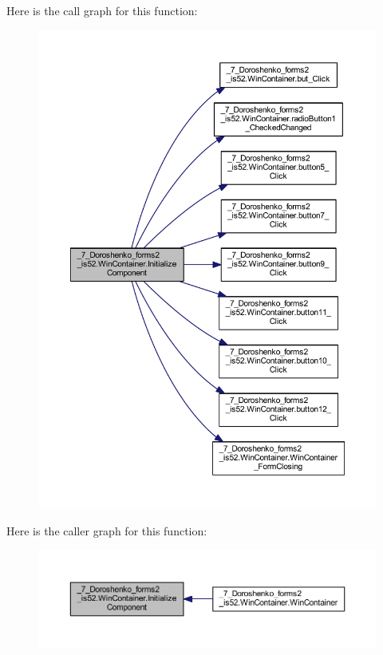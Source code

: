 Here is the call graph for this function\+:
\nopagebreak
\begin{figure}[H]
\begin{center}
\leavevmode
\includegraphics[width=350pt]{class__7___doroshenko__forms2__is52_1_1_win_container_a2273d289ead85c38898634df2eca5613_cgraph}
\end{center}
\end{figure}
Here is the caller graph for this function\+:
\nopagebreak
\begin{figure}[H]
\begin{center}
\leavevmode
\includegraphics[width=350pt]{class__7___doroshenko__forms2__is52_1_1_win_container_a2273d289ead85c38898634df2eca5613_icgraph}
\end{center}
\end{figure}
